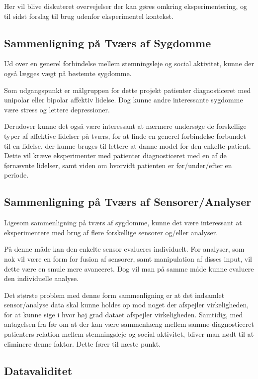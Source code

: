 Her vil blive diskuteret overvejelser der kan gøres omkring eksperimentering, og til sidst forslag til brug udenfor eksperimentel kontekst.

\subsection{Sammenligning på Tværs af Sygdomme}
Ud over en generel forbindelse mellem stemningsleje og social aktivitet, kunne der også lægges vægt på bestemte sygdomme.

Som udgangspunkt er målgruppen for dette projekt patienter diagnosticeret med unipolar eller bipolar affektiv lidelse.
Dog kunne andre interessante sygdomme være stress og lettere depressioner.

Derudover kunne det også være interessant at nærmere undersøge de forskellige typer af affektive lidelser på tværs, for at finde en generel forbindelse forbundet til en lidelse, der kunne bruges til lettere at danne model for den enkelte patient.
Dette vil kræve eksperimenter med patienter diagnosticeret med en af de førnævnte lidelser, samt viden om hvorvidt patienten er før/under/efter en periode.

\subsection{Sammenligning på Tværs af Sensorer/Analyser}
Ligesom sammenligning på tværs af sygdomme, kunne det være interessant at eksperimentere med brug af flere forskellige sensorer og/eller analyser.

På denne måde kan den enkelte sensor evalueres individuelt.
For analyser, som nok vil være en form for fusion af sensorer, samt manipulation af disses input, vil dette være en smule mere avanceret.
Dog vil man på samme måde kunne evaluere den individuelle analyse.

Det største problem med denne form sammenligning er at det indsamlet sensor/analyse data skal kunne holdes op mod noget der afspejler virkeligheden, for at kunne sige i hvor høj grad dataet afspejler virkeligheden.
Samtidig, med antagelsen fra før om at der kan være sammenhæng mellem samme-diagnosticeret patienters relation mellem stemningsleje og social aktivitet, bliver man nødt til at eliminere denne faktor.
Dette fører til næste punkt.

\subsection{Datavaliditet}


